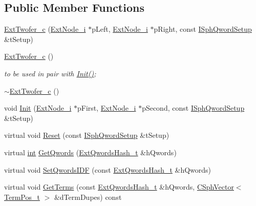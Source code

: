\subsection*{Public Member Functions}
\begin{DoxyCompactItemize}
\item 
\hyperlink{classExtTwofer__c_ac2670c8989a226c2e2ddb748ae2a4e7c}{Ext\-Twofer\-\_\-c} (\hyperlink{classExtNode__i}{Ext\-Node\-\_\-i} $\ast$p\-Left, \hyperlink{classExtNode__i}{Ext\-Node\-\_\-i} $\ast$p\-Right, const \hyperlink{classISphQwordSetup}{I\-Sph\-Qword\-Setup} \&t\-Setup)
\item 
\hyperlink{classExtTwofer__c_a62cbf2f89ec60860d1b322a522ffef4d}{Ext\-Twofer\-\_\-c} ()
\begin{DoxyCompactList}\small\item\em to be used in pair with \hyperlink{classExtTwofer__c_a626b6563aa5f26837a50534f1609ad83}{Init()}; \end{DoxyCompactList}\item 
\hyperlink{classExtTwofer__c_a2ff57eb27a0e4512b14fff1140d1102f}{$\sim$\-Ext\-Twofer\-\_\-c} ()
\item 
void \hyperlink{classExtTwofer__c_a626b6563aa5f26837a50534f1609ad83}{Init} (\hyperlink{classExtNode__i}{Ext\-Node\-\_\-i} $\ast$p\-First, \hyperlink{classExtNode__i}{Ext\-Node\-\_\-i} $\ast$p\-Second, const \hyperlink{classISphQwordSetup}{I\-Sph\-Qword\-Setup} \&t\-Setup)
\item 
virtual void \hyperlink{classExtTwofer__c_a4873bd7fe4efcb00a6cbe483a716f29b}{Reset} (const \hyperlink{classISphQwordSetup}{I\-Sph\-Qword\-Setup} \&t\-Setup)
\item 
virtual \hyperlink{sphinxexpr_8cpp_a4a26e8f9cb8b736e0c4cbf4d16de985e}{int} \hyperlink{classExtTwofer__c_adb29716d2d57d9b559e1f5aecf694809}{Get\-Qwords} (\hyperlink{sphinxsearch_8cpp_a814fc096e1ffb29d072d79b72b702fe6}{Ext\-Qwords\-Hash\-\_\-t} \&h\-Qwords)
\item 
virtual void \hyperlink{classExtTwofer__c_a061b634b65d5b2247e3048fdedd8d38c}{Set\-Qwords\-I\-D\-F} (const \hyperlink{sphinxsearch_8cpp_a814fc096e1ffb29d072d79b72b702fe6}{Ext\-Qwords\-Hash\-\_\-t} \&h\-Qwords)
\item 
virtual void \hyperlink{classExtTwofer__c_afc46840013019c94333809030317a775}{Get\-Terms} (const \hyperlink{sphinxsearch_8cpp_a814fc096e1ffb29d072d79b72b702fe6}{Ext\-Qwords\-Hash\-\_\-t} \&h\-Qwords, \hyperlink{classCSphVector}{C\-Sph\-Vector}$<$ \hyperlink{structTermPos__t}{Term\-Pos\-\_\-t} $>$ \&d\-Term\-Dupes) const 
\item 

\end{DoxyCompactItemize}
